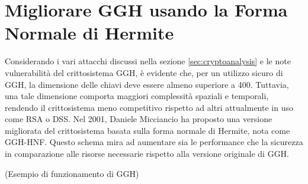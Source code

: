 \chapter{Migliorare GGH usando la Forma Normale di Hermite}
\label{cap:GGH-HNF}
%
%
Considerando i vari attacchi discussi nella sezione \ref{sec:cryptoanalysis} e le note vulnerabilità 
del crittosistema GGH, è evidente che, per un utilizzo sicuro di 
GGH, la dimensione delle chiavi deve essere almeno superiore a 400. Tuttavia, una tale 
dimensione comporta maggiori complessità spaziali e temporali, rendendo il crittosistema 
meno competitivo rispetto ad altri attualmente in uso come RSA o DSS. Nel 2001, Daniele 
Micciancio \cite{HNF01} ha proposto una versione migliorata del crittosistema basata sulla 
forma normale di Hermite, nota come GGH-HNF. Questo schema mira ad aumentare sia le 
performance che la sicurezza in comparazione alle 
risorse necessarie rispetto alla versione originale di GGH.



\begin{exmp} (Esempio di funzionamento di GGH)

\end{exmp}